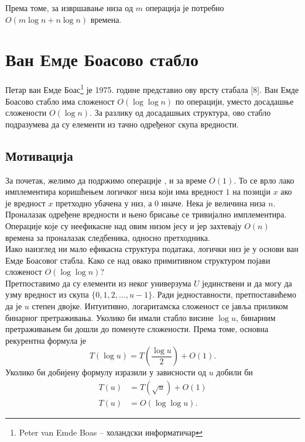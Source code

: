 \documentclass[11pt, a4paper]{article}
\theoremstyle{remark}
\numberwithin{equation}{section}
\begin{document}
	\noindent Према томе, за извршавање низа од $m$ операција је потребно $O(m \log n + n \log n)$ времена.
	
	\newpage
	
	\section{Ван Емде Боасово стабло}
	
	Петар ван Емде Боас\footnote{Peter van Emde Boas -- холандски информатичар} је 1975. године представио ову врсту стабала [8]. Ван Емде Боасово стабло има сложеност $O(\log\log n)$ по операцији, уместо досадашње сложености $O(\log n)$. За разлику од досадашњих структура, ово стабло подразумева да су елементи из тачно одређеног скупа вредности.
	
	\subsection{Мотивација}
	За почетак, желимо да подржимо операције ,  и  за време $O(1)$. То се врло лако имплементира коришћењем логичког низа који има вредност $1$ на позицји $x$ ако је вредност $x$ претходно убачена у низ, а $0$ иначе. Нека је величина низа $n$. Проналазак одређене вредности и њено брисање се тривијално имплементира. Операције које су неефикасне над овим низом јесу  и  јер захтевају $O(n)$ времена за проналазак следбеника, односно претходника. \\
	
	\noindent Иако наизглед ни мало ефикасна структура података, логички низ је у основи ван Емде Боасовог стабла. Како се над овако примитивном структуром појави сложеност $O(\log\log n)$? \\
	
	\noindent Претпоставимо да су елементи из неког универзума $U$ јединствени и да могу да узму вредност из скупа $\{0, 1, 2, ..., u-1\}$. Ради једноставности, претпоставићемо да је $u$ степен двојке. Интуитивно, логаритамска сложеност се јавља приликом бинарног претраживања. Уколико би имали стабло висине $\log u$, бинарним претраживањем би дошли до поменуте сложености. Према томе, основна рекурентна формула је
	\begin{equation}
	T(\log u)=T\left(\frac{\log u}{2}\right)+O(1).
	\end{equation}
	Уколико би добијену формулу изразили у зависности од $u$ добили би	
	\begin{equation}
		\begin{split}
		T(u) &= T(\sqrt u)+O(1) \\
		T(u) &= O(\log\log u).
		\end{split}
	\end{equation}
	
\end{document}
